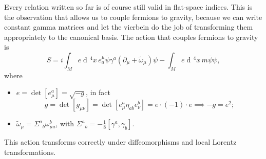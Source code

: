 \documentclass[a4paper,12pt]{book}
\newcommand{\dd}{\mathop{\mathrm{d}\!}{}}
\theoremstyle{definition}
\theoremstyle{remark}
\let\oldcdot\cdot
\renewcommand{\cdot}{\! \oldcdot \!}
\begin{document}
Every relation written so far is of course still valid in flat-space indices. This is the observation that allows us to couple fermions to gravity, because we can write constant gamma matrices and let the vierbein do the job of transforming them appropriately to the canonical basis. The action that couples fermions to gravity is
\[S=i\int_Me\dd^4x\,e^\mu_a\overline\psi\gamma^a(\partial_\mu+\tilde\omega_\mu)\psi-\int_Me\dd^4x\,m\overline\psi\psi,\]
where
\begin{itemize}
\item $e=\det[e^a_\mu]=\sqrt{-g}$, in fact
\[g=\det[g_{\mu\nu}]=\det[e^a_\mu\eta_{ab}e^b_\nu]=e\cdot(-1)\cdot e\implies -g=e^2;\]
\item $\tilde\omega_\mu=\Sigma^a{}_b\omega^b_{\mu a}$, with $\Sigma^a{}_b=-\frac{1}{8}[\gamma^a,\gamma_b]$.
\end{itemize}
This action transforms correctly under diffeomorphisms and local Lorentz transformations.
\end{document}
